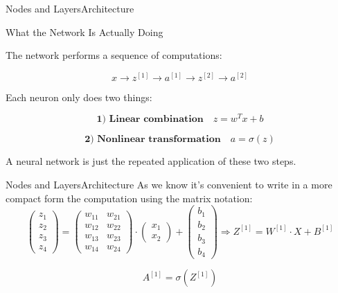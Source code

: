 \documentclass[aspectratio=169]{beamer}
\begin{document}
\begin{frame}{Nodes and Layers}{Architecture}
\end{frame}
%
%
\begin{frame}{What the Network Is Actually Doing}

The network performs a sequence of computations:

\[
x \rightarrow z^{[1]} \rightarrow a^{[1]} \rightarrow z^{[2]} \rightarrow a^{[2]}
\]

Each neuron only does two things:

\[
\textbf{1) Linear combination}
\quad z = w^T x + b
\]

\[
\textbf{2) Nonlinear transformation}
\quad a = \sigma(z)
\]

A neural network is just the repeated application of these two steps.
\end{frame}
%
%
\begin{frame}{Nodes and Layers}{Architecture}
As we know it's convenient to write in a more compact form the computation using the matrix notation:
\begin{equation}
\begin{pmatrix}
z_1 \\ z_2 \\ z_3 \\ z_4
\end{pmatrix} =
\begin{pmatrix}
w_{11} & w_{21} \\ w_{12} & w_{22} \\ w_{13} & w_{23} \\ w_{14} & w_{24}
\end{pmatrix} 
\cdot 
\begin{pmatrix}
x_1 \\ x_2 
\end{pmatrix}
+
\begin{pmatrix}
b_1 \\ b_2 \\ b_3 \\ b_4
\end{pmatrix} 
\Rightarrow Z^{[1]} = W^{[1]} \cdot X + B^{[1]} 
\end{equation}

$$ A^{[1]} = \sigma\left({Z^{[1]}}\right) $$
\end{frame}
\end{document}
